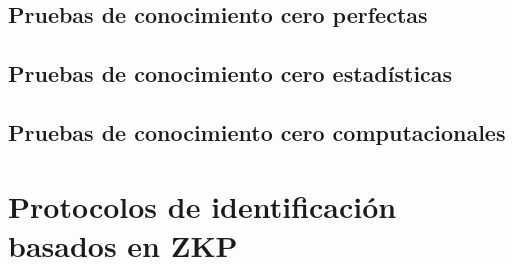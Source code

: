 

\subsection{Pruebas de conocimiento cero perfectas}

\subsection{Pruebas de conocimiento cero estadísticas}

\subsection{Pruebas de conocimiento cero computacionales}


\section{Protocolos de identificación basados en ZKP}

